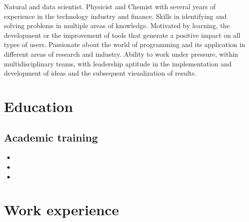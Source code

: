 \documentclass[11pt, letterpaper, sans]{moderncv}        %
\begin{document}
\maketitle

\small{
Natural and data scientist. Physicist and Chemist with several years of experience in the technology industry and
finance. Skills in identifying and solving problems in multiple areas of knowledge. Motivated by learning, the development or the improvement of tools that generate a positive impact on all types of users. Passionate about
the world of programming and its application in different areas of research and industry. Ability to work
under pressure, within multidisciplinary teams, with leadership aptitude in the implementation and development of
ideas and the subsequent visualization of results.
}

\section{Education}

\vspace{5pt}

\subsection{Academic training}

\vspace{5pt}

\begin{itemize}

\item{}
\item{}
\item{}
\end{itemize}

\vspace{2pt}

\section{Work experience}
\end{document}
